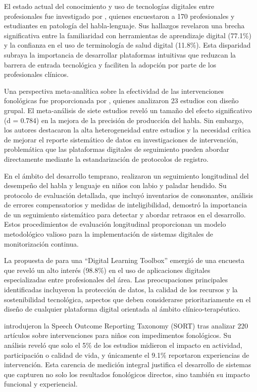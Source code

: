 \documentclass[12pt, oneside]{article}
\begin{document}
El estado actual del conocimiento y uso de tecnologías digitales entre profesionales fue investigado por \textcite{Lin2021}, quienes encuestaron a 170 profesionales y estudiantes en patología del habla-lenguaje. Sus hallazgos revelaron una brecha significativa entre la familiaridad con herramientas de aprendizaje digital (77.1\%) y la confianza en el uso de terminología de salud digital (11.8\%). Esta disparidad subraya la importancia de desarrollar plataformas intuitivas que reduzcan la barrera de entrada tecnológica y faciliten la adopción por parte de los profesionales clínicos.

Una perspectiva meta-analítica sobre la efectividad de las intervenciones fonológicas fue proporcionada por \textcite{Kunnari2024}, quienes analizaron 23 estudios con diseño grupal. El meta-análisis de siete estudios reveló un tamaño del efecto significativo (d = 0.784) en la mejora de la precisión de producción del habla. Sin embargo, los autores destacaron la alta heterogeneidad entre estudios y la necesidad crítica de mejorar el reporte sistemático de datos en investigaciones de intervención, problemática que las plataformas digitales de seguimiento pueden abordar directamente mediante la estandarización de protocolos de registro.

En el ámbito del desarrollo temprano, \textcite{Scherer2018} realizaron un seguimiento longitudinal del desempeño del habla y lenguaje en niños con labio y paladar hendido. Su protocolo de evaluación detallada, que incluyó inventarios de consonantes, análisis de errores compensatorios y medidas de inteligibilidad, demostró la importancia de un seguimiento sistemático para detectar y abordar retrasos en el desarrollo. Estos procedimientos de evaluación longitudinal proporcionan un modelo metodológico valioso para la implementación de sistemas digitales de monitorización continua.

La propuesta de \textcite{Lin2022} para una ``Digital Learning Toolbox'' emergió de una encuesta que reveló un alto interés (98.8\%) en el uso de aplicaciones digitales especializadas entre profesionales del área. Las preocupaciones principales identificadas incluyeron la protección de datos, la calidad de los recursos y la sostenibilidad tecnológica, aspectos que deben considerarse prioritariamente en el diseño de cualquier plataforma digital orientada al ámbito clínico-terapéutico.

\textcite{Baker2022} introdujeron la Speech Outcome Reporting Taxonomy (SORT) tras analizar 220 artículos sobre intervenciones para niños con impedimentos fonológicos. Su análisis reveló que solo el 5\% de los estudios midieron el impacto en actividad, participación o calidad de vida, y únicamente el 9.1\% reportaron experiencias de intervención. Esta carencia de medición integral justifica el desarrollo de sistemas que capturen no solo los resultados fonológicos directos, sino también su impacto funcional y experiencial.
\end{document}
